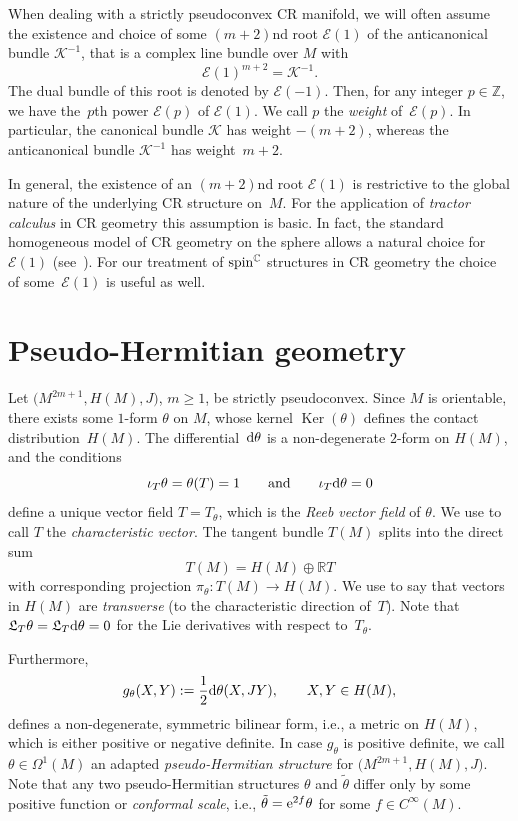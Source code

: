 \documentclass[pdftex]{sigma}
\numberwithin{equation}{section}
\newcommand{\RR}{\mathbb{R}}
\newcommand{\ZZ}{\mathbb{Z}}
\newcommand{\CC}{\mathbb{C}}
\begin{document}
When dealing with a strictly pseudoconvex CR manifold, we will often assume the existence and choice
of some $(m+2)$nd root $\mathcal{E}(1)$ of the anticanonical bundle $\mathcal{K}^{-1}$,
that is a complex line bundle over $M$ with
\[
\mathcal{E}(1)^{m+2} =\mathcal{K}^{-1} .
\]
The dual bundle of this root is denoted by $\mathcal{E}(-1)$. Then, for any integer $p\in\ZZ$, we have the~$p$th power $\mathcal{E}(p)$
of $\mathcal{E}(1)$. We call $p$ the {\em weight} of~$\mathcal{E}(p)$.
In particular, the canonical bundle $\mathcal{K}$ has weight $-(m+2)$, whereas
the anticanonical bundle $\mathcal{K}^{-1}$ has weight~$m+2$.

In general, the existence of an $(m+2)$nd root $\mathcal{E}(1)$ is restrictive to the global nature of the underlying CR structure on~$M$.
For the application of {\em tractor calculus} in CR geometry this assumption is basic.
In fact, the standard homogeneous model of CR geometry on the sphere allows a natural choice for $\mathcal{E}(1)$ (see~\cite{CG1}).
For our treatment of ${\rm spin}^\CC$ structures in CR geometry the choice of some~$\mathcal{E}(1)$ is useful as well.

\section{Pseudo-Hermitian geometry} \label{Sec3}

Let $\big(M^{2m+1}, H(M), J\big)$, $m\geq 1$, be strictly pseudoconvex.
Since $M$ is orientable, there exists some $1$-form $\theta$ on $M$, whose kernel $\operatorname{Ker}(\theta)$
defines the contact distribution~$H(M)$. The differen\-tial~${\rm d}\theta$ is a non-degenerate $2$-form on $H(M)$, and
the conditions \[ \iota_T\theta=\theta(T)=1\qquad\mbox{and}\qquad \iota_T{\rm d}\theta=0\]
define a unique vector field $T=T_\theta$, which is the {\em Reeb vector field} of $\theta$.
We use to call $T$ the {\em characteristic vector}. The tangent
bundle $T(M)$ splits into the direct sum
\[T(M) = H(M) \oplus \RR T\]
with corresponding projection $\pi_\theta\colon T(M)\to H(M)$. We use to say that vectors in $H(M)$ are {\em transverse}
(to the characteristic direction of~$T$).
Note that $\mathfrak{L}_T\theta=\mathfrak{L}_T{\rm d}\theta=0$ for the Lie derivatives
with respect to~$T_\theta$.

Furthermore,
\[
g_\theta(X,Y) := \frac{1}{2}{\rm d}\theta(X, JY),\qquad X,Y\in H(M),\]
defines a non-degenerate, symmetric bilinear form, i.e., a metric on $H(M)$, which is
either positive or negative definite.
In case $g_\theta$ is positive definite, we call $\theta\in\Omega^1(M)$ an adapted {\em pseudo-Hermitian structure} for $\big(M^{2m+1}, H(M), J\big)$. Note that any two pseudo-Hermitian structures $\theta$ and $\tilde{\theta}$
differ only by some positive function or {\em conformal scale}, i.e., $\tilde{\theta}={\rm e}^{2f}\theta$ for some $f\in C^\infty(M)$.
\end{document}
